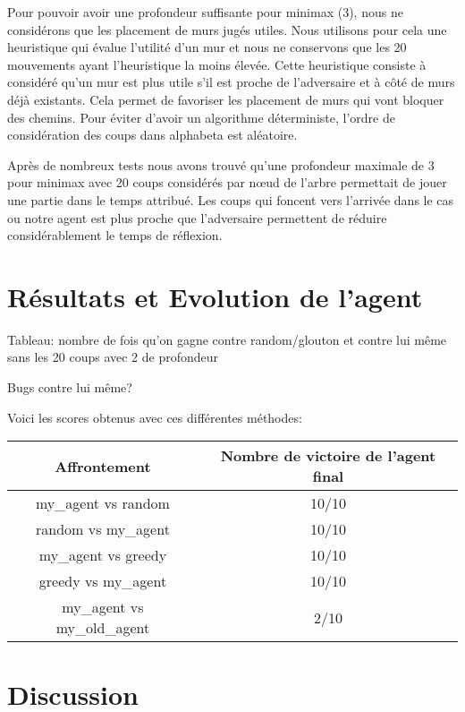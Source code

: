 \documentclass[12pt]{article}
\begin{document}
Pour pouvoir avoir une profondeur suffisante pour minimax (3), nous ne considérons que les placement de murs jugés utiles. Nous utilisons pour cela une heuristique qui évalue l'utilité d'un mur et nous ne conservons que les 20 mouvements ayant l'heuristique la moins élevée. Cette heuristique consiste à considéré qu'un mur est plus utile s'il est proche de l'adversaire et à côté de murs déjà existants. Cela permet de favoriser les placement de murs qui vont bloquer des chemins. Pour éviter d'avoir un algorithme déterministe, l'ordre de considération des coups dans alphabeta est aléatoire. 

Après de nombreux tests nous avons trouvé qu'une profondeur maximale de 3 pour minimax avec 20 coups considérés par nœud de l'arbre permettait de jouer une partie dans le temps attribué. Les coups qui foncent vers l'arrivée dans le cas ou notre agent est plus proche que l'adversaire permettent de réduire considérablement le temps de réflexion. 

\section*{Résultats et Evolution de l'agent}

Tableau: nombre de fois qu'on gagne contre random/glouton et contre lui même sans les 20 coups avec 2 de profondeur

Bugs contre lui même?

Voici les scores obtenus avec ces différentes méthodes:
\begin{center}
  \begin{tabular}{ |c|c| }
    \hline
    Affrontement & Nombre de victoire de l'agent final \\\hline\hline
    my\_agent vs random & 10/10 \\\hline
    random vs my\_agent & 10/10 \\\hline
    my\_agent vs greedy & 10/10 \\\hline
    greedy vs my\_agent & 10/10 \\\hline
    my\_agent vs my\_old\_agent & 2/10 \\\hline

  \end{tabular}
\end{center}


\section*{Discussion}
\end{document}

